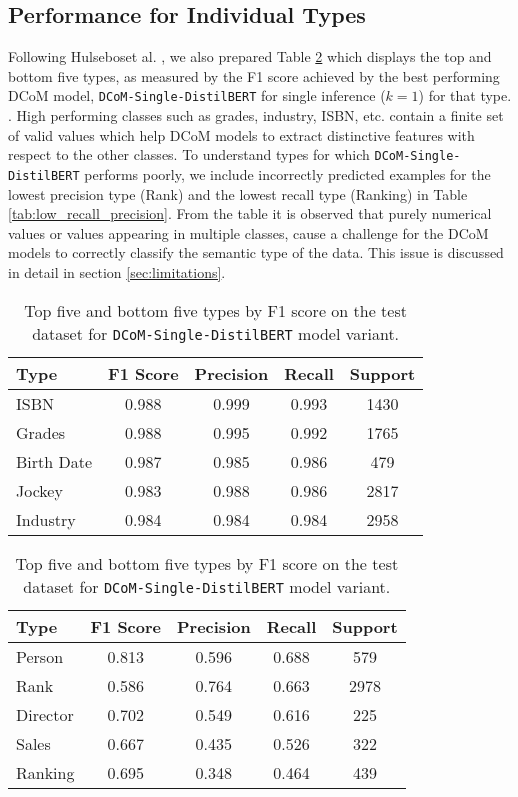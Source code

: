 \documentclass{article}
\begin{document}
\subsection{Performance for Individual Types}
Following Hulseboset al. \cite{Hulsebos}, we also prepared Table \ref{tab:top_bottom_f1} which displays the top and bottom five types, as measured by the F1 score achieved by the best performing DCoM model, \texttt{DCoM-Single-DistilBERT} for single inference ($k=1$) for that type. . High performing classes such as grades, industry, ISBN, etc. contain a finite set of valid values which help DCoM models to extract distinctive features with respect to the other classes. To understand types for which \texttt{DCoM-Single-DistilBERT} performs poorly, we include incorrectly predicted examples for the lowest precision type (Rank) and the lowest recall type (Ranking) in Table \ref{tab:low_recall_precision}. From the table it is observed that purely numerical values or values appearing in multiple classes, cause a challenge for the DCoM models to correctly classify the semantic type of the data. This issue is discussed in detail in section \ref{sec:limitations}.

\begin{table}[ht]
	\centering
	\begin{adjustbox}{center}
		\begin{tabular}{lcccc}
			\hline
			\textbf{Type} & \textbf{F1 Score} & \textbf{Precision} & \textbf{Recall} & \textbf{Support}\\
			\hline
			ISBN & 0.988 & 0.999 & 0.993 & 1430 \\
			Grades  & 0.988 & 0.995 & 0.992 & 1765 \\
			Birth Date & 0.987 & 0.985 & 0.986 & 479 \\
			Jockey & 0.983 & 0.988 & 0.986 & 2817 \\
			Industry & 0.984 & 0.984 & 0.984 & 2958 \\
			\hline
		\end{tabular}
	\end{adjustbox}
	\caption*{(a) Top 5 types by F1 Score}

	
	\begin{adjustbox}{center}
		\begin{tabular}{lcccc}
			\hline
			\textbf{Type} & \textbf{F1 Score} & \textbf{Precision} & \textbf{Recall} & \textbf{Support}\\
			\hline
			Person & 0.813 & 0.596 & 0.688 & 579 \\
			Rank  & 0.586 & 0.764 & 0.663 & 2978 \\
			Director & 0.702 & 0.549 & 0.616 & 225 \\
			Sales & 0.667 & 0.435 & 0.526 & 322 \\
			Ranking & 0.695 & 0.348 & 0.464 & 439 \\
			\hline
		\end{tabular}
	\end{adjustbox}
	\caption*{(a) Bottom 5 types by F1 Score}
	\caption{Top five and bottom five types by F1 score on the test dataset for \texttt{DCoM-Single-DistilBERT} model variant.}
	\label{tab:top_bottom_f1}
\end{table}
\end{document}
